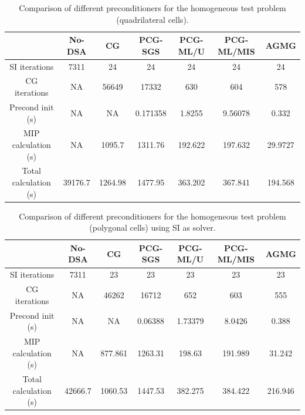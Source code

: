 \documentclass[preprint,10pt]{elsarticle}
\renewcommand{\(}{\left(}
\renewcommand{\)}{\right)}
\renewcommand{\[}{\left[}
\renewcommand{\]}{\right]}
\begin{document}
%
%
\begin{table}[!htbp]
  \begin{center}
    \caption{Comparison of different preconditioners for the homogeneous test problem (quadrilateral cells).}
    \begin{tabular}{|c|c|c|c|c|c|c|}
      \hline
      & No-DSA & CG & PCG-SGS & PCG-ML/U & PCG-ML/MIS & AGMG \\
      \hline
      SI iterations   & 7311    & 24      & 24       & 24      & 24      & 24 \\
      CG iterations   & NA      & 56649   & 17332    & 630     & 604     & 578 \\
\hline
    Precond init (s)   & NA      & NA      & 0.171358 & 1.8255  & 9.56078 & 0.332 \\
 MIP calculation (s)   & NA      & 1095.7  & 1311.76  & 192.622 & 197.632 & 29.9727 \\
 Total calculation (s) & 39176.7 & 1264.98 & 1477.95  & 363.202 & 367.841 &  194.568 \\
      \hline
    \end{tabular}
    \label{comparison_homog_quad}
  \end{center}
\end{table}
%
\begin{table}[!htbp]
  \begin{center}
    \caption{Comparison of different preconditioners for the homogeneous test
    problem (polygonal cells) using SI as solver.}
    \begin{tabular}{|c|c|c|c|c|c|c|}
      \hline
      & No-DSA & CG & PCG-SGS & PCG-ML/U & PCG-ML/MIS & AGMG \\
      \hline
      SI iterations   & 7311    & 23      & 23      & 23      & 23      & 23 \\
      CG iterations   & NA      & 46262   & 16712   & 652     & 603     & 555 \\
\hline
   Precond init (s)   & NA      & NA      & 0.06388 & 1.73379 & 8.0426  & 0.388 \\
MIP calculation (s)   & NA      & 877.861 & 1263.31 & 198.63  & 191.989 & 31.242 \\
Total calculation (s) & 42666.7 & 1060.53 & 1447.53 & 382.275 & 384.422 & 216.946 \\
      \hline
    \end{tabular}
    \label{comparison_homog_poly_si}
  \end{center}
\end{table}
\end{document}
